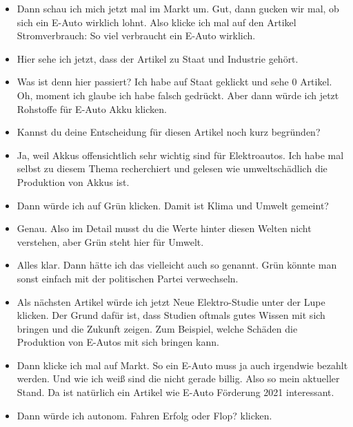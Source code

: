 {\begin{itemize}[]
            \item {} Dann schau ich mich jetzt mal im Markt um.
                  Gut, dann gucken wir mal, ob sich ein E-Auto wirklich lohnt.
                  Also klicke ich mal auf den Artikel \flqq Stromverbrauch: So viel verbraucht ein E-Auto wirklich\frqq{}.
            \item {} Hier sehe ich jetzt, dass der Artikel zu Staat und Industrie gehört.
            \item {} Was ist denn hier passiert?
                  Ich habe auf Staat geklickt und sehe 0 Artikel.
                  Oh, moment ich glaube ich habe falsch gedrückt.
                  Aber dann würde ich jetzt \flqq Rohstoffe für E-Auto Akku\frqq{} klicken.
            \item {} Kannst du deine Entscheidung für diesen Artikel noch kurz begründen?
            \item {} Ja, weil Akkus offensichtlich sehr wichtig sind für Elektroautos.
                  Ich habe mal selbst zu diesem Thema recherchiert und gelesen wie umweltschädlich die Produktion von Akkus ist.
            \item {} Dann würde ich auf Grün klicken. Damit ist Klima und Umwelt gemeint?
            \item {} Genau. Also im Detail musst du die Werte hinter diesen Welten nicht verstehen, aber Grün steht hier für Umwelt.
            \item {} Alles klar. Dann hätte ich das vielleicht auch so genannt.
                  Grün könnte man sonst einfach mit der politischen Partei verwechseln.
            \item {} Als nächsten Artikel würde ich jetzt \flqq Neue Elektro-Studie unter der Lupe\frqq{} klicken.
                  Der Grund dafür ist, dass Studien oftmals gutes Wissen mit sich bringen und die Zukunft zeigen.
                  Zum Beispiel, welche Schäden die Produktion von E-Autos mit sich bringen kann.
            \item {} Dann klicke ich mal auf Markt.
                  So ein E-Auto muss ja auch irgendwie bezahlt werden.
                  Und wie ich weiß sind die nicht gerade billig.
                  Also so mein aktueller Stand.
                  Da ist natürlich ein Artikel wie \flqq E-Auto Förderung 2021\frqq{} interessant.
            \item {} Dann würde ich \flqq autonom. Fahren Erfolg oder Flop?\frqq{} klicken.

\end{itemize}}
